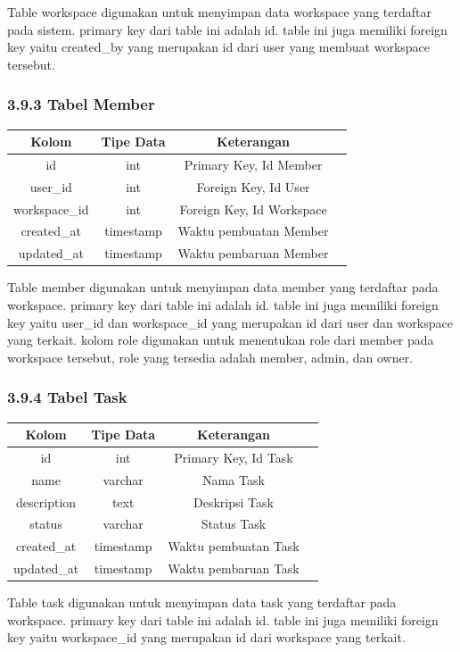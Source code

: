 Table workspace digunakan untuk menyimpan data workspace yang terdaftar pada sistem. primary key dari table ini adalah id.
table ini juga memiliki foreign key yaitu created\_by yang merupakan id dari user yang membuat workspace tersebut.

\subsubsection*{3.9.3	Tabel Member}
\begin{center}
  \begin{tabular}{|c|c|c|c|}
    \hline
    \textbf{Kolom} & \textbf{Tipe Data} & \textbf{Keterangan} \\
    \hline
    id & int & Primary Key, Id Member \\
    user\_id & int & Foreign Key, Id User \\
    workspace\_id & int & Foreign Key, Id Workspace \\
    created\_at & timestamp & Waktu pembuatan Member \\
    updated\_at & timestamp & Waktu pembaruan Member \\
    \hline
  \end{tabular}
\end{center}

Table member digunakan untuk menyimpan data member yang terdaftar pada workspace. primary key dari table ini adalah id.
table ini juga memiliki foreign key yaitu user\_id dan workspace\_id yang merupakan id dari user dan workspace yang terkait.
kolom role digunakan untuk menentukan role dari member pada workspace tersebut, role yang tersedia adalah member, admin, dan owner.

\subsubsection*{3.9.4	Tabel Task}
\begin{center}
  \begin{tabular}{|c|c|c|c|}
    \hline
    \textbf{Kolom} & \textbf{Tipe Data} & \textbf{Keterangan} \\
    \hline
    id & int & Primary Key, Id Task \\
    name & varchar & Nama Task \\
    description & text & Deskripsi Task \\
    status & varchar & Status Task \\
    created\_at & timestamp & Waktu pembuatan Task \\
    updated\_at & timestamp & Waktu pembaruan Task \\
    \hline
  \end{tabular}
\end{center}

Table task digunakan untuk menyimpan data task yang terdaftar pada workspace. primary key dari table ini adalah id.
table ini juga memiliki foreign key yaitu workspace\_id yang merupakan id dari workspace yang terkait.


